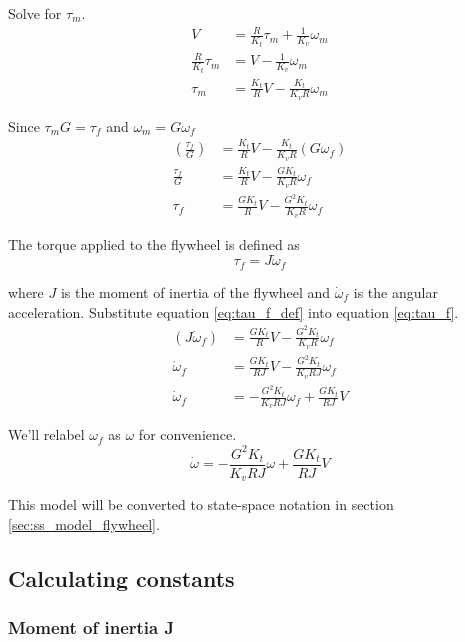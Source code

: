 Solve for $\tau_m$.
\begin{align*}
  V &= \frac{R}{K_t} \tau_m + \frac{1}{K_v} \omega_m \\
  \frac{R}{K_t} \tau_m &= V - \frac{1}{K_v} \omega_m \\
  \tau_m &= \frac{K_t}{R} V - \frac{K_t}{K_v R} \omega_m
\end{align*}

Since $\tau_m G = \tau_f$ and $\omega_m = G \omega_f$
\begin{align}
  \left(\frac{\tau_f}{G}\right) &= \frac{K_t}{R} V -
    \frac{K_t}{K_v R} (G \omega_f) \nonumber \\
  \frac{\tau_f}{G} &= \frac{K_t}{R} V - \frac{G K_t}{K_v R} \omega_f \nonumber
    \\
  \tau_f &= \frac{G K_t}{R} V - \frac{G^2 K_t}{K_v R} \omega_f \label{eq:tau_f}
\end{align}

The torque applied to the flywheel is defined as
\begin{equation}
  \tau_f = J \dot{\omega}_f \label{eq:tau_f_def}
\end{equation}

where $J$ is the moment of inertia of the flywheel and $\dot{\omega}_f$ is the
angular acceleration. Substitute equation \eqref{eq:tau_f_def} into equation
\eqref{eq:tau_f}.
\begin{align*}
  (J \dot{\omega}_f) &= \frac{G K_t}{R} V - \frac{G^2 K_t}{K_v R} \omega_f \\
  \dot{\omega}_f &= \frac{G K_t}{RJ} V - \frac{G^2 K_t}{K_v RJ} \omega_f \\
  \dot{\omega}_f &= -\frac{G^2 K_t}{K_v RJ} \omega_f + \frac{G K_t}{RJ} V
\end{align*}

We'll relabel $\omega_f$ as $\omega$ for convenience.
\begin{equation}
  \dot{\omega} = -\frac{G^2 K_t}{K_v RJ} \omega + \frac{G K_t}{RJ} V
    \label{eq:dot_omega_flywheel}
\end{equation}

This model will be converted to state-space notation in section
\ref{sec:ss_model_flywheel}.

\subsection{Calculating constants}

\subsubsection{Moment of inertia J}

